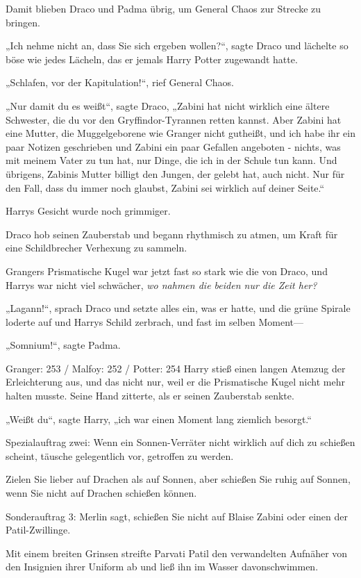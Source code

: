 {Damit blieben Draco und Padma übrig, um General Chaos zur Strecke zu bringen.

„Ich nehme nicht an, dass Sie sich ergeben wollen?“, sagte Draco und lächelte so böse wie jedes Lächeln, das er jemals Harry Potter zugewandt hatte.

„Schlafen, vor der Kapitulation!“, rief General Chaos.

„Nur damit du es weißt“, sagte Draco, „Zabini hat nicht wirklich eine ältere Schwester, die du vor den Gryffindor-Tyrannen retten kannst. Aber Zabini hat eine Mutter, die Muggelgeborene wie Granger nicht gutheißt, und ich habe ihr ein paar Notizen geschrieben und Zabini ein paar Gefallen angeboten - nichts, was mit meinem Vater zu tun hat, nur Dinge, die ich in der Schule tun kann. Und übrigens, Zabinis Mutter billigt den Jungen, der gelebt hat, auch nicht. Nur für den Fall, dass du immer noch glaubst, Zabini sei wirklich auf deiner Seite.“

Harrys Gesicht wurde noch grimmiger.

Draco hob seinen Zauberstab und begann rhythmisch zu atmen, um Kraft für eine Schildbrecher Verhexung zu sammeln.

Grangers Prismatische Kugel war jetzt fast so stark wie die von Draco, und Harrys war nicht viel schwächer, \emph{wo nahmen die beiden nur die Zeit her?}

„Lagann!“, sprach Draco und setzte alles ein, was er hatte, und die grüne Spirale loderte auf und Harrys Schild zerbrach, und fast im selben Moment—

„Somnium!“, sagte Padma.

Granger: 253 / Malfoy: 252 / Potter: 254 Harry stieß einen langen Atemzug der Erleichterung aus, und das nicht nur, weil er die Prismatische Kugel nicht mehr halten musste. Seine Hand zitterte, als er seinen Zauberstab senkte.

„Weißt du“, sagte Harry, „ich war einen Moment lang ziemlich besorgt.“

Spezialauftrag zwei: Wenn ein Sonnen-Verräter nicht wirklich auf dich zu schießen scheint, täusche gelegentlich vor, getroffen zu werden.

Zielen Sie lieber auf Drachen als auf Sonnen, aber schießen Sie ruhig auf Sonnen, wenn Sie nicht auf Drachen schießen können.

Sonderauftrag 3: Merlin sagt, schießen Sie nicht auf Blaise Zabini oder einen der Patil-Zwillinge.

Mit einem breiten Grinsen streifte Parvati Patil den verwandelten Aufnäher von den Insignien ihrer Uniform ab und ließ ihn im Wasser davonschwimmen.

}
